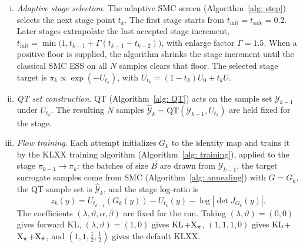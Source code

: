 \documentclass{article}
\begin{document}
\begin{enumerate}[(i)]
\item \emph{Adaptive stage selection.} The adaptive SMC screen (Algorithm~\ref{alg: step}) selects the next stage point $t_k$. The first stage starts from $t_{\mathrm{init}}=t_{\mathrm{safe}}=0.2$. Later stages extrapolate the last accepted stage increment, $t_{\mathrm{init}}=\min\bigl(1,t_{k-1}+\Gamma(t_{k-1}-t_{k-2})\bigr)$, with enlarge factor $\Gamma=1.5$. When a positive floor is supplied, the algorithm shrinks the stage increment until the classical SMC ESS on all $N$ samples clears that floor. The selected stage target is $\pi_k\propto\exp(-U_{t_k})$, with $U_{t_k}=(1-t_k)U_0+t_kU$.

\item \emph{QT set construction}. QT (Algorithm~\ref{alg: QT}) acts on the sample set $\mathcal Y_{k-1}$ under $U_{t_k}$. The resulting $N$ samples $\hat{\mathcal Y}_k=\mathrm{QT}(\mathcal Y_{k-1},U_{t_k})$ are held fixed for the stage.

\item \emph{Flow training}. Each attempt initializes $G_k$ to the identity map and trains it by the KLXX training algorithm (Algorithm~\ref{alg: training}), applied to the stage $\pi_{k-1}\to\pi_k$: the batches of size $B$ are drawn from $\mathcal Y_{k-1}$, the target surrogate samples come from SMC (Algorithm~\ref{alg: annealing}) with $G=G_k$, the QT sample set is $\hat{\mathcal Y}_k$, and the stage log-ratio is
\begin{equation*}
    z_k(y) = U_{t_{k-1}}(G_k(y)) - U_{t_k}(y) - \log|\det J_{G_k}(y)|.
\end{equation*}
The coefficients $(\lambda,\vartheta,\alpha,\beta)$ are fixed for the run. Taking $(\lambda,\vartheta)=(0,0)$ gives forward KL, $(\lambda,\vartheta)=(1,0)$ gives $\mathrm{KL}$+$\mathrm{X}_{\pi}$, $(1,1,1,0)$ gives $\mathrm{KL}$+$\mathrm{X}_\pi$+$\mathrm{X}_{\hat\pi}$, and $(1,1,\frac12,\frac12)$ gives the default KLXX.


\end{enumerate}
\end{document}
